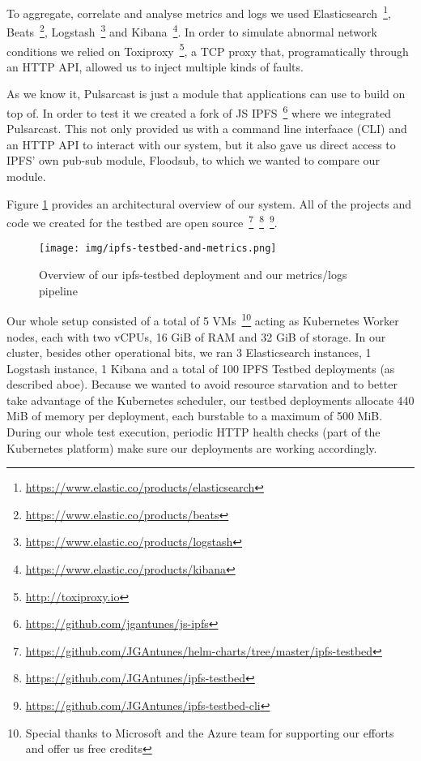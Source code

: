 To aggregate, correlate and analyse metrics and logs we used Elasticsearch~\footnote{\url{https://www.elastic.co/products/elasticsearch}}, Beats~\footnote{\url{https://www.elastic.co/products/beats}}, Logstash~\footnote{\url{https://www.elastic.co/products/logstash}} and Kibana~\footnote{\url{https://www.elastic.co/products/kibana}}. In order to simulate abnormal network conditions we relied on Toxiproxy~\footnote{\url{http://toxiproxy.io}}, a TCP proxy that, programatically through an HTTP API, allowed us to inject multiple kinds of faults.

As we know it, Pulsarcast is just a module that applications can use to build
on top of. In order to test it we created a fork of JS
IPFS~\footnote{\url{https://github.com/jgantunes/js-ipfs}} where we integrated
Pulsarcast. This not only provided us with a command line interfaace (CLI) and
an HTTP API to interact with our system, but it also gave us direct access to
IPFS' own pub-sub module, Floodsub, to which we wanted to compare our module.

Figure \ref{fig:ipfs-testbed-and-metrics} provides an architectural overview of
our system. All of the projects and code we created for the testbed are
open
source~\footnote{\url{https://github.com/JGAntunes/helm-charts/tree/master/ipfs-testbed}}~\footnote{\url{https://github.com/JGAntunes/ipfs-testbed}}~\footnote{\url{https://github.com/JGAntunes/ipfs-testbed-cli}}.

\begin{figure}[!htb]
  \centering
  \texttt{[image: img/ipfs-testbed-and-metrics.png]}
  \caption{Overview of our ipfs-testbed deployment and our metrics/logs
  pipeline}
  \label{fig:ipfs-testbed-and-metrics}
\end{figure}

Our whole setup consisted of a total of 5 VMs~\footnote{Special thanks to
Microsoft and the Azure team for supporting our efforts and offer us free
credits} acting as Kubernetes Worker nodes, each with two vCPUs, 16 GiB of RAM
and 32 GiB of storage. In our cluster, besides other operational bits, we ran 3
Elasticsearch instances, 1 Logstash instance, 1 Kibana and a total of 100 IPFS
Testbed deployments (as described aboe). Because we wanted to avoid resource
starvation and to better take advantage of the Kubernetes scheduler, our
testbed deployments allocate 440 MiB of memory per deployment, each burstable
to a maximum of 500 MiB. During our whole test execution, periodic HTTP health
checks (part of the Kubernetes platform) make sure our deployments are working
accordingly.

